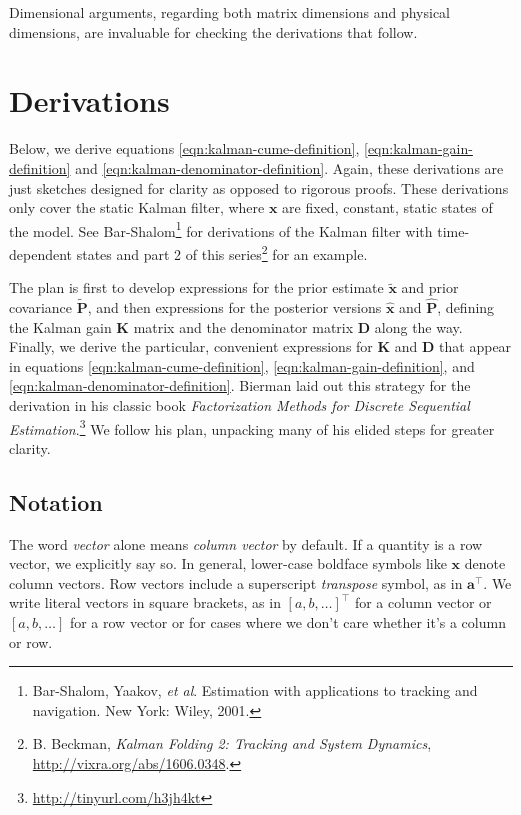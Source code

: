\documentclass[10pt,oneside,x11names]{article}
\begin{document}
Dimensional arguments, regarding both matrix dimensions and physical dimensions,
are invaluable for checking the derivations that follow.

\section{Derivations}
\label{sec:orgheadline17}

Below, we derive equations \ref{eqn:kalman-cume-definition},
\ref{eqn:kalman-gain-definition} and \ref{eqn:kalman-denominator-definition}.
Again, these derivations are just sketches designed for clarity as opposed to
rigorous proofs.
These derivations only cover the
static Kalman filter, where \(\mathbold{x}\) are
fixed, constant, static states of the model. See Bar-Shalom\footnote{Bar-Shalom, Yaakov, \emph{et al}. Estimation with applications to tracking and navigation. New York: Wiley, 2001.} for
derivations of the Kalman filter with time-dependent states and part 2 of this series\footnote{B. Beckman, \emph{Kalman Folding 2: Tracking and System Dynamics}, \url{http://vixra.org/abs/1606.0348}.} for
an example.

The plan is first to develop expressions for the prior estimate
\(\tilde{\mathbold{x}}\) and prior covariance \(\tilde{\mathbold{P}}\), and then expressions
for the posterior versions \(\hat{\mathbold{x}}\) and \(\hat{\mathbold{P}}\),
defining the Kalman gain \(\mathbold{K}\) matrix and the denominator matrix
\(\mathbold{D}\) along the way. Finally, we derive the particular, convenient expressions for \(\mathbold{K}\)
and \(\mathbold{D}\) that appear in equations \ref{eqn:kalman-cume-definition},
\ref{eqn:kalman-gain-definition}, and \ref{eqn:kalman-denominator-definition}.
Bierman laid out this strategy for the derivation in his classic book
\emph{Factorization Methods for Discrete Sequential Estimation}.\footnote{\url{http://tinyurl.com/h3jh4kt}} We follow
his plan, unpacking many of his elided steps for greater clarity.

\subsection{Notation}
\label{sec:orgheadline4}

The word \emph{vector} alone means \emph{column vector} by default. If a quantity is a row
vector, we explicitly say so. In general, lower-case boldface symbols like
\(\mathbold{x}\) denote column vectors. Row vectors include a superscript
\emph{transpose} symbol, as in \(\mathbold{a}^\intercal\). We write literal vectors in
square brackets, as in \(\left[a, b, \ldots\right]^\intercal\) for a column vector
or \(\left[a, b, \ldots\right]\) for a row vector or for cases where we don't care
whether it's a column or row.
\end{document}

